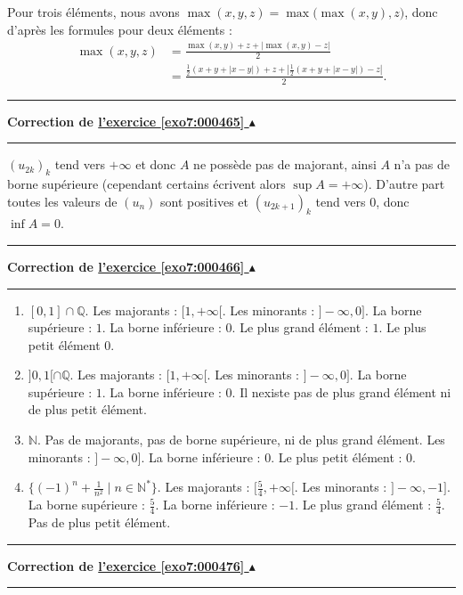 \documentclass[11pt,a4paper]{article}
\newcommand{\Nn}{\mathbb{N}} \newcommand{\N}{\mathbb{N}}
\newcommand{\Qq}{\mathbb{Q}} \newcommand{\Q}{\mathbb{Q}}
\newcounter{exo}
\newcommand{\correction}[1]{\hypertarget{cor7:#1}{}\label{cor7:#1}{\bf Correction de \hyperlink{exo7:#1}{l'exercice \ref{exo7:#1} $\blacktriangle$}}\vspace{1mm}\hrule\vspace{1mm}}
\newcommand{\fincorrection}{\vspace{1mm}\hrule\vspace*{7mm}}
\begin{document}
Pour trois \'el\'ements, nous avons $\max(x,y,z) = \max
\big(\max(x,y),z\big)$, donc d'apr\`es les formules pour deux
\'el\'ements :
\begin{align*}
\max(x,y,z) &= \frac{\max(x,y)+z+| \max(x,y)-z |}{2} \\
&= \frac{\frac12(x+y+|x-y|)+z+\left|\frac12(x+y+|x-y|) -z
\right|}{2}.
\end{align*}
\fincorrection
\correction{000465}
$(u_{2k})_k$ tend vers $+\infty$ et donc 
$A$ ne possède pas de majorant, ainsi
$A$ n'a pas de borne supérieure (cependant certains écrivent alors $\sup A = +\infty$). 
D'autre part toutes les valeurs de $(u_n)$ sont
positives et $(u_{2k+1})_k$ tend vers $0$, donc $\inf A =0$.
\fincorrection
\correction{000466}
\begin{enumerate}
\item $[0,1]\cap \Qq$. Les majorants   : $[1,+\infty[$. Les minorants : $]-\infty,0]$. La borne sup\'erieure :
$1$. La borne inf\'erieure : $0$. Le plus grand \'el\'ement : $1$. Le
plus petit \'el\'ement $0$.
\item $]0,1[\cap \Qq$. Les majorants   : $[1,+\infty[$. Les minorants : $]-\infty,0]$. La borne sup\'erieure :
$1$. La borne inf\'erieure : $0$. Il nexiste pas de plus grand
\'el\'ement ni de plus petit \'el\'ement.
\item $\Nn$. Pas de majorants, pas de borne sup\'erieure, ni de plus grand \'el\'ement. Les minorants : $]-\infty,0]$.  La borne inf\'erieure : $0$. Le plus petit \'el\'ement : $0$.
\item $\Big\lbrace (-1)^n+\frac{1}{n^2} \mid n \in \Nn^* \Big\rbrace$. Les majorants   : $[\frac54,+\infty[$. Les minorants : $]-\infty,-1]$. La borne sup\'erieure :
$\frac54$. La borne inf\'erieure : $-1$. Le plus grand \'el\'ement :
$\frac54$. Pas de  plus petit \'el\'ement.
\end{enumerate}
\fincorrection
\correction{000476}
\end{document}
